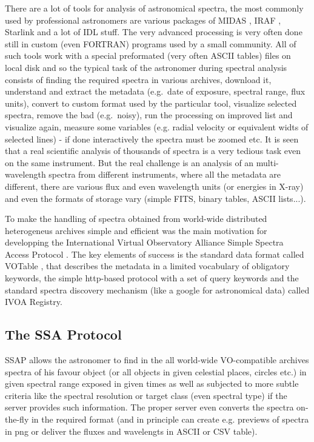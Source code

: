 \documentclass[final,authoryear,5p,times,twocolumn]{elsarticle}
\begin{document}
There are a lot of tools for analysis of astronomical spectra, the
most commonly used by professional astronomers are various packages of
MIDAS \citep[][]{1992ASPC...25..115W}, IRAF
\citep[][]{2012ASPC..461..595F}, Starlink
\citep[][]{1982QJRAS..23..485D} and a lot of IDL
stuff. The very advanced processing is very often done still in custom
(even FORTRAN) programs used by a small community.  All of such tools
work with a special preformated (very often ASCII tables) files on
local disk and so the typical task of the astronomer during spectral
analysis consists of finding the required spectra in various archives,
download it, understand and extract the metadata (e.g.\ date of
exposure, spectral range, flux units), convert to custom format used
by the particular tool, visualize selected spectra, remove the bad
(e.g.\ noisy), run the processing on improved list and visualize
again, measure some variables (e.g. radial velocity or equivalent
widts of selected lines) - if done interactively the spectra must be
zoomed etc.  It is seen that a real scientific analysis of thousands
of spectra is a very tedious task even on the same instrument. But the
real challenge is an analysis of an multi-wavelength spectra from
different instruments, where all the metadata are different, there are
various flux and even wavelength units (or energies in X-ray) and even
the formats of storage vary (simple FITS, binary tables, ASCII
lists...).

To make the handling of spectra obtained from world-wide distributed
heterogeneus archives simple and efficient was the main motivation for
developping the International Virtual Observatory Alliance Simple
Spectra Access Protocol \citep[IVOA SSAP;][]{ssap}. The key elements
of success is the standard data format called VOTable
\citep{2004tivo.conf..118O}, that describes the metadata in a limited
vocabulary of obligatory keywords, the simple http-based protocol with
a set of query keywords and the standard spectra discovery mechanism
(like a google for astronomical data) called IVOA Registry.


\subsection{The SSA Protocol}


SSAP allows the astronomer to find in the all world-wide VO-compatible
archives spectra of his favour object (or all objects in given celestial
places, circles etc.) in given spectral range exposed in given times as well as
subjected to more subtle criteria like the spectral resolution or target class
(even spectral type) if the server provides such information.  The proper
server even converts the spectra on-the-fly in the required format (and in
principle can create e.g. previews of spectra in png or deliver the fluxes and
wavelengts in ASCII or CSV table).
\end{document}
